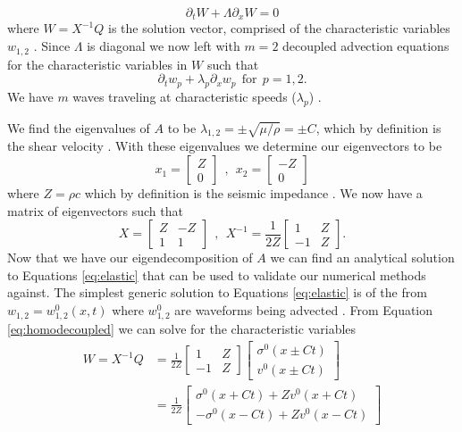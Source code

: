 \documentclass[review,onefignum,onetabnum]{siamart171218}
\begin{document}
\begin{equation}
     \partial_t W + \Lambda \partial_x W = 0
     \label{eq:homodecoupled}
\end{equation}
where $W=X^{-1}Q$ is the solution vector, comprised of the characteristic variables $w_{1,2}$ \cite{comp_seis, leveque_2002}. Since $\Lambda$ is diagonal we now left with $m=2$ decoupled advection equations \cite{leveque_2002} for the characteristic variables in $W$ such that
\begin{equation}
    \partial_t w_p + \lambda_p \partial_x w_p \:\: \text{for}  \:\: p = 1,2.
    \label{eq:charcterisitc_eqaution} 
\end{equation}
We have $m$ waves traveling at characteristic speeds ($\lambda_p$) \cite{leveque_2002}.

We find the eigenvalues of $A$ to be $\lambda_{1,2} = \pm \sqrt{\mu/\rho}=\pm C$, which by definition is the shear velocity \cite{comp_seis}. With these eigenvalues we determine our eigenvectors to be 
\begin{equation}
    x_1 = \begin{bmatrix} Z \\ 0\end{bmatrix} \:\:, \:\: x_2 = \begin{bmatrix} -Z \\ 0\end{bmatrix}
\end{equation}
where $Z=\rho c$ which by definition is the seismic impedance \cite{comp_seis}. We now have a matrix of eigenvectors such that 
\begin{equation}
    X = \begin{bmatrix} Z & -Z \\ 1 & 1\end{bmatrix} \:\: , \:\: X^{-1} = \frac{1}{2Z}\begin{bmatrix} 1 & Z \\ -1 & Z\end{bmatrix}.
\end{equation}
Now that we have our eigendecomposition of $A$ we can find an analytical solution to Equations \ref{eq:elastic} that can be used to validate our numerical methods against. The simplest generic solution to Equations \ref{eq:elastic} is of the from $w_{1,2} = w_{1,2}^0 (x,t)$ where $w^0_{1,2}$ are waveforms being advected \cite{leveque_2002,comp_seis}. From Equation \ref{eq:homodecoupled} we can solve for the characteristic variables 
\begin{equation}
\begin{aligned}
    W = X^{-1}Q &= \frac{1}{2Z} \begin{bmatrix} 1 & Z \\ -1 & Z\end{bmatrix} \begin{bmatrix} \sigma^0(x\pm Ct) \\ v^0(x\pm Ct) \end{bmatrix} \\
    &= \frac{1}{2Z} \begin{bmatrix} \sigma^0(x+Ct) + Zv^0(x+Ct)\\ -\sigma^0(x-Ct) + Zv^0(x-Ct)\end{bmatrix} 
\end{aligned}
\end{equation}
\end{document}

